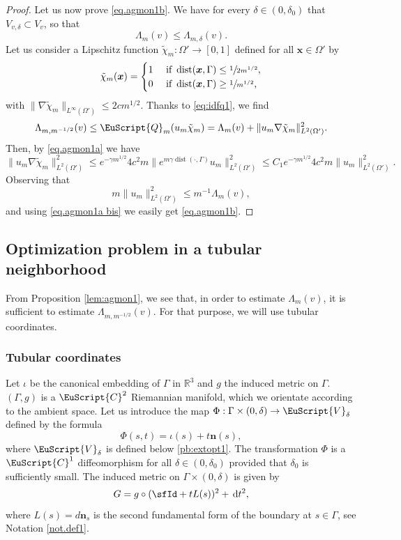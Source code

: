 \documentclass[JEP,XML,SOM,Unicode]{cedram}
\let\mathcal \EuScript
\newcommand{\cC}{\mathcal{C}}
\newcommand{\cQ}{\mathcal{Q}}
\newcommand{\cV}{\mathcal{V}}
\DeclareMathOperator{\dist}{dist}
\theoremstyle{plain}
\theoremstyle{definition}
\newcommand{\RR}{\mathbb{R}}
\newcommand{\dx}{\mathrm{\,d}}
\newcommand{\bn}{{\boldsymbol n}}
\newcommand{\bx}{{\boldsymbol x}}
\begin{document}
\begin{proof}
Let us now prove \eqref{eq.agmon1b}. We have for every $\delta\in(0,\delta_0)$ that $V_{v,\delta}\subset V_v$, so that
\[
\Lambda_{m}(v)\leq\Lambda_{m,\delta}(v).
\]
Let us consider a Lipschitz function $\tilde \chi_m : \Omega' \to [0,1]$ defined for all $\bx\in \Omega'$ by
\[
\tilde \chi_m(\bx) =
\begin{cases}
1 & \mbox{ if }\dist(\bx,\Gamma)\leq \sfrac{1}{2m^{1/2}},\\
0 & \mbox{ if }\dist(\bx,\Gamma)\geq \sfrac{1}{m^{1/2}},
\end{cases}
\]
with $\|\nabla \tilde\chi_{m}\|_{L^\infty(\Omega')}\leq 2 cm^{1/2}$. Thanks to \eqref{eq:idfq1}, we find
\begin{equation}\label{eq.agmon1a bis}
\Lambda_{m,m^{-1/2}}(v)\leq \cQ_m(u_m\tilde \chi_m) = \Lambda_m(v) + \|u_m\nabla \tilde \chi_m\|^2_{L^2(\Omega')}.
\end{equation}
Then, by \eqref{eq.agmon1a} we have
\[ \|u_m\nabla \tilde \chi_m\|^2_{L^2(\Omega')}\leq e^{-\gamma m^{1/2}}4 c^2m\|e^{m\gamma\dist(\cdot, \Gamma)}u_m\|^2_{L^2(\Omega')}\leq
C_1e^{-\gamma m^{1/2}}4 c^2m \|u_m\|^2_{L^2(\Omega')}.\]
Observing that
\[m\|u_{m}\|^2_{L^2(\Omega')}\leq m^{-1}\Lambda_{m}(v),\]
and using \eqref{eq.agmon1a bis} we easily get \eqref{eq.agmon1b}.
\end{proof}

\subsection{Optimization problem in a tubular neighborhood}\label{sec.tub}
From Proposition \ref{lem:agmon1}, we see that, in order to estimate $\Lambda_{m}(v)$, it is sufficient to estimate $\Lambda_{m,m^{-1/2}}(v)$. For that purpose, we will use tubular coordinates.

\subsubsection{Tubular coordinates}
Let $\iota$ be the canonical embedding of $\Gamma$ in $\RR^3$ and $g$ the induced metric on $\Gamma$. $(\Gamma,g)$ is a $\cC^{2}$ Riemannian manifold, which we orientate according to the ambient space. Let us introduce the map $\Phi:\Gamma\times(0,\delta)\to\cV_{\delta}$ defined by the formula
\begin{equation*}
\Phi(s,t)=\iota(s)+t\bn(s),
\end{equation*}
where $\cV_\delta$ is defined below \eqref{pb:extopt1}.
The transformation $\Phi$ is a $\cC^{1}$ diffeomorphism for all $\delta\in(0,\delta_0)$ provided that $\delta_0$ is sufficiently small. The induced metric on $\Gamma\times(0,\delta)$ is given by
\[G=g\circ (\sfId+tL(s))^{2}+\dx t^2,\]
where $L(s)=d\bn_{s}$ is the second fundamental form of the boundary at $s\in\Gamma$, see Notation \ref{not.def1}.
\end{document}
